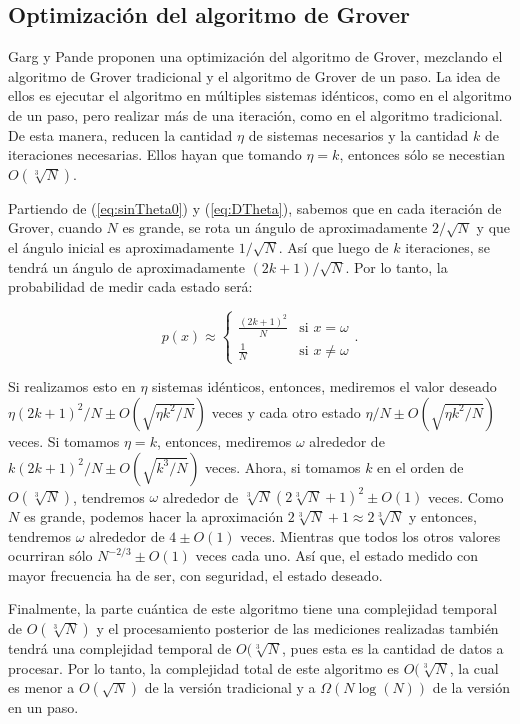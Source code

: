 \subsection{Optimización del algoritmo de Grover}

Garg y Pande \cite{Garg} proponen una optimización del algoritmo de Grover, mezclando el algoritmo de Grover tradicional y el algoritmo de Grover de un paso. La idea de ellos es ejecutar el algoritmo en múltiples sistemas idénticos, como en el algoritmo de un paso, pero realizar más de una iteración, como en el algoritmo tradicional. De esta manera, reducen la cantidad $\eta$ de sistemas necesarios y la cantidad $k$ de iteraciones necesarias. Ellos hayan que tomando $\eta = k$, entonces sólo se necestian $O(\sqrt[3]{N})$.

Partiendo de (\ref{eq:sinTheta0}) y (\ref{eq:DTheta}), sabemos que en cada iteración de Grover, cuando $N$ es grande, se rota un ángulo de aproximadamente $2/\sqrt{N}$ y que el ángulo inicial es aproximadamente $1/\sqrt{N}$. Así que luego de $k$ iteraciones, se tendrá un ángulo de aproximadamente $(2k + 1)/\sqrt{N}$. Por lo tanto, la probabilidad de medir cada estado será:

\begin{equation}
    p(x) \approx
    \begin{cases}
        \frac{(2k + 1)^2}{N} & \text{si } x = \omega \\
        \frac{1}{N} & \text{si } x \neq \omega
    \end{cases} .
\end{equation}

Si realizamos esto en $\eta$ sistemas idénticos, entonces, mediremos el valor deseado $\eta (2k + 1)^2 / N \pm O(\sqrt{\eta k^2/N})$ veces y cada otro estado $\eta / N \pm O(\sqrt{\eta k^2/N})$ veces. Si tomamos $\eta = k$, entonces, mediremos $\omega$ alrededor de $k (2k + 1)^2 / N \pm O(\sqrt{k^3/N})$ veces. Ahora, si tomamos $k$ en el orden de $O(\sqrt[3]{N})$, tendremos $\omega$ alrededor de $\sqrt[3]{N} ( 2 \sqrt[3]{N} + 1)^2 \pm O(1)$ veces. Como $N$ es grande, podemos hacer la aproximación $2 \sqrt[3]{N} + 1 \approx 2 \sqrt[3]{N}$ y entonces, tendremos $\omega$ alrededor de $4 \pm O(1)$ veces. Mientras que todos los otros valores ocurriran sólo $N^{-2/3} \pm O(1)$ veces cada uno. Así que, el estado medido con mayor frecuencia ha de ser, con seguridad, el estado deseado.

Finalmente, la parte cuántica de este algoritmo tiene una complejidad temporal de $O(\sqrt[3]{N})$ y el procesamiento posterior de las mediciones realizadas también tendrá una complejidad temporal de $O(\sqrt[3]{N}$, pues esta es la cantidad de datos a procesar. Por lo tanto, la complejidad total de este algoritmo es $O(\sqrt[3]{N}$, la cual es menor a $O(\sqrt{N})$ de la versión tradicional y a $\Omega(N \log(N))$ de la versión en un paso.

